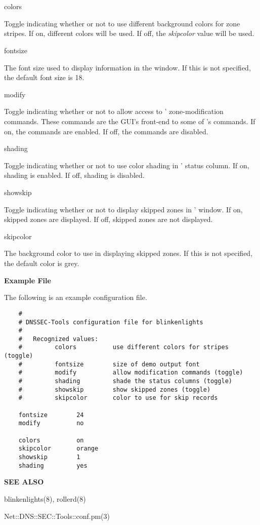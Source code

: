 \begin{description}

\item colors\verb" "

Toggle indicating whether or not to use different background colors for
 zone stripes.
If on, different colors will be used.
If off, the {\it skipcolor} value will be used.

\item fontsize\verb" "

The font size used to display information in the  window.
If this is not specified, the default font size is 18.

\item modify\verb" "

Toggle indicating whether or not to allow access to '
zone-modification commands.  These commands are the GUI's front-end to
some of 's commands.
If on, the commands are enabled.
If off, the commands are disabled.

\item shading\verb" "

Toggle indicating whether or not to use color shading in '
status column.
If on, shading is enabled.
If off, shading is disabled.

\item showskip\verb" "

Toggle indicating whether or not to display skipped zones in
' window.
If on, skipped zones are displayed.
If off, skipped zones are not displayed.

\item skipcolor\verb" "

The background color to use in displaying skipped zones.
If this is not specified, the default color is grey.

\end{description}

{\bf Example File}

The following is an example  configuration file.

\begin{verbatim}
    #
    # DNSSEC-Tools configuration file for blinkenlights
    #
    #   Recognized values:
    #         colors          use different colors for stripes (toggle)
    #         fontsize        size of demo output font
    #         modify          allow modification commands (toggle)
    #         shading         shade the status columns (toggle)
    #         showskip        show skipped zones (toggle)
    #         skipcolor       color to use for skip records

    fontsize        24
    modify          no

    colors          on
    skipcolor       orange
    showskip        1
    shading         yes
\end{verbatim}

{\bf SEE ALSO}

blinkenlights(8),
rollerd(8)

Net::DNS::SEC::Tools::conf.pm(3)

